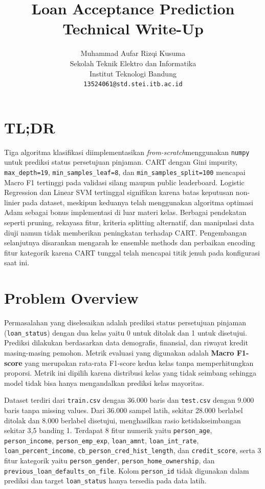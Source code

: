 \documentclass{article}
\title{\textbf{Loan Acceptance Prediction Technical Write-Up}}
\author{
Muhammad Aufar Rizqi Kusuma \\
Sekolah Teknik Elektro dan Informatika\\
Institut Teknologi Bandung\\
\texttt{13524061@std.stei.itb.ac.id} \\
}
\begin{document}
\maketitle

\section{TL;DR}

Tiga algoritma klasifikasi diimplementasikan \textit{from-scratch}menggunakan \texttt{numpy} untuk prediksi status persetujuan pinjaman. CART dengan Gini impurity, \texttt{max\_depth=19}, \texttt{min\_samples\_leaf=8}, dan \texttt{min\_samples\_split=100} mencapai Macro F1 tertinggi pada validasi silang maupun public leaderboard. Logistic Regression dan Linear SVM tertinggal signifikan karena batas keputusan non-linier pada dataset, meskipun keduanya telah menggunakan algoritma optimasi Adam sebagai bonus implementasi di luar materi kelas. Berbagai pendekatan seperti pruning, rekayasa fitur, kriteria splitting alternatif, dan manipulasi data diuji namun tidak memberikan peningkatan terhadap CART. Pengembangan selanjutnya disarankan mengarah ke ensemble methods dan perbaikan encoding fitur kategorik karena CART tunggal telah mencapai titik jenuh pada konfigurasi saat ini.

\section{Problem Overview}

Permasalahan yang diselesaikan adalah prediksi status persetujuan pinjaman (\texttt{loan\_status}) dengan dua kelas yaitu 0 untuk ditolak dan 1 untuk disetujui. Prediksi dilakukan berdasarkan data demografis, finansial, dan riwayat kredit masing-masing pemohon. Metrik evaluasi yang digunakan adalah \textbf{Macro F1-score} yang merupakan rata-rata F1-score kedua kelas tanpa memperhitungkan proporsi. Metrik ini dipilih karena distribusi kelas yang tidak seimbang sehingga model tidak bisa hanya mengandalkan prediksi kelas mayoritas.

Dataset terdiri dari \texttt{train.csv} dengan 36.000 baris dan \texttt{test.csv} dengan 9.000 baris tanpa missing values. Dari 36.000 sampel latih, sekitar 28.000 berlabel ditolak dan 8.000 berlabel disetujui, menghasilkan rasio ketidakseimbangan sekitar 3,5 banding 1. Terdapat 8 fitur numerik yaitu \texttt{person\_age}, \texttt{person\_income}, \texttt{person\_emp\_exp}, \texttt{loan\_amnt}, \texttt{loan\_int\_rate}, \texttt{loan\_percent\_income}, \texttt{cb\_person\_cred\_hist\_length}, dan \texttt{credit\_score}, serta 3 fitur kategorik yaitu \texttt{person\_gender}, \texttt{person\_home\_ownership}, dan \texttt{previous\_loan\_defaults\_on\_file}. Kolom \texttt{person\_id} tidak digunakan dalam prediksi dan target \texttt{loan\_status} hanya tersedia pada data latih.
\end{document}
